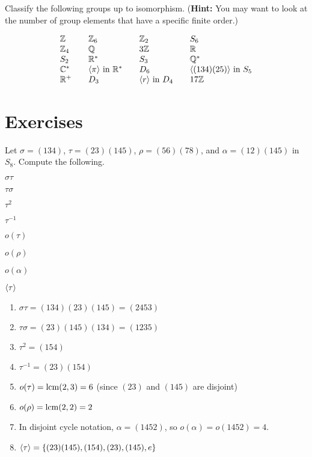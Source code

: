 \begin{example}{}
Classify the following groups up to isomorphism. (\textbf{Hint:}
You may want to look at the number of group elements that have
a specific finite order.)

\renewcommand{\arraystretch}{2}
$$\begin{array}{lllllll}

\Z && \Z_6 && \Z_2&& S_6\\
\Z_4 && \fatq && 3\Z && \fatr\\
S_2&& \fatr^* && S_3 && \fatq^*\\
\fatc^* && \<\pi\> \mbox{ in } \fatr^* &&  D_6 &&\<(134)(25)\>
\mbox{ in } S_5\\
\fatr^+ && D_3 && \<r\> \mbox{ in } D_4 &&17\Z \hspace{50pt}
\end{array}$$
\end{example}


\pagebreak
\section{Exercises}



\begin{exercise}
Let $\sigma=(134)$, $\tau=(23)(145)$, $\rho=(56)(78)$, and $\alpha=(12)(145)$ in $S_8$. Compute the following.

\medskip
\noindent
\begin{inparaenum}[(a)] \item $\sigma \tau$ \hfill \item $\tau \sigma$  \hfill \item $\tau^2$  \hfill \item $\tau^{-1}$  \hfill \item $o(\tau)$  \hfill \item $o(\rho)$  \hfill \item $o(\alpha)$  \hfill \item $\langle\tau\rangle$
\end{inparaenum}
\end{exercise}

\begin{solution}[print=true]


\begin{enumerate}
\item $\sigma \tau= (134)(23)(145)=(2453)$
\item $\tau \sigma=  (23)(145)(134)=(1235)$
\item $\tau^2=(154)$
\item $\tau^{-1}=(23)(154)$
\item $o(\tau)=\operatorname{lcm}(2,3)=6$ (since $(23)$ and $(145)$ are disjoint)
\item $o(\rho)=\operatorname{lcm}(2,2)=2$
\item In disjoint cycle notation, $\alpha=(1452)$, so $o(\alpha)=o(1452)=4$.
\item $\langle\tau\rangle=\{(23)(145), (154), (23), (145), e\}$
\end{enumerate}

\end{solution}

